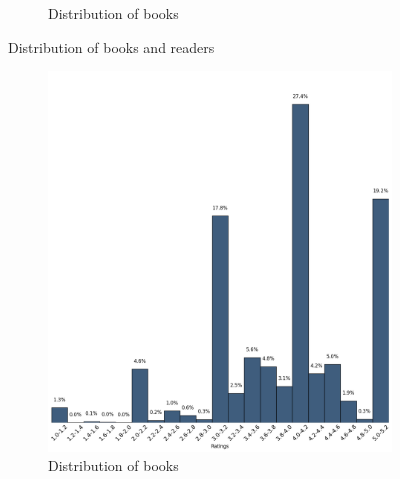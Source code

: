 \documentclass[11pt]{article}
\begin{document}
\begin{figure}[ht]
\begin{subfigure}[b]{0.5\textwidth}
                \caption{Distribution of books}
                \label{fig:books_books_read}
        \end{subfigure}
        \caption{Distribution of books and readers}
\end{figure}







\begin{figure}
        \centering
        \begin{subfigure}[b]{0.5\textwidth}
                \includegraphics[width=\textwidth]{images/books_ratings}
                \caption{Distribution of books}
        \end{subfigure}%
        ~ %
        \begin{subfigure}[b]{0.5\textwidth}

\end{subfigure}
\end{figure}
\end{document}
